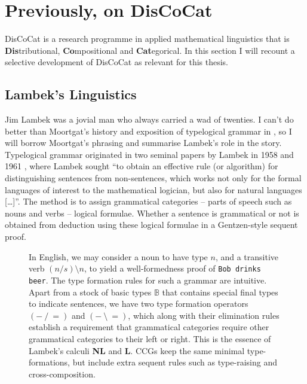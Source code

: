 \section{Previously, on DisCoCat}\label{sec:previously}

DisCoCat is a research programme in applied mathematical linguistics that is \textbf{Dis}tributional, \textbf{Co}mpositional and \textbf{Cat}egorical. In this section I will recount a selective development of DisCoCat as relevant for this thesis.

\subsection{Lambek's Linguistics}

Jim Lambek was a jovial man who always carried a wad of twenties. I can't do better than Moortgat's history and exposition of typelogical grammar in \citep{moortgatTypelogicalGrammar2014b}, so I will borrow Moortgat's phrasing and summarise Lambek's role in the story. Typelogical grammar originated in two seminal papers by Lambek in 1958 \citep{lambekMathematicsSentenceStructure1958} and 1961 \citep{lambekCalculusSyntacticTypes1961}, where Lambek sought “to obtain an effective rule (or algorithm) for distinguishing sentences from non-sentences, which works not only for the formal languages of interest to the mathematical logician, but also for natural languages […]”. The method is to assign grammatical categories -- parts of speech such as nouns and verbs -- logical formulae. Whether a sentence is grammatical or not is obtained from deduction using these logical formulae in a Gentzen-style sequent proof.

\begin{figure}[h!]
\centering
{}
\caption{In English, we may consider a noun to have type $n$, and a transitive verb $(n/s)\setminus n$, to yield a well-formedness proof of \texttt{Bob drinks beer}. The type formation rules for such a grammar are intuitive. Apart from a stock of basic types $\mathbb{B}$ that contains special final types to indicate sentences, we have two type formation operators $(- \ / \ =)$ and $(- \ \setminus \ =)$, which along with their elimination rules establish a requirement that grammatical categories require other grammatical categories to their left or right. This is the essence of Lambek's calculi \textbf{NL} and \textbf{L}. CCGs keep the same minimal type-formations, but include extra sequent rules such as type-raising and cross-composition.}
\end{figure}


